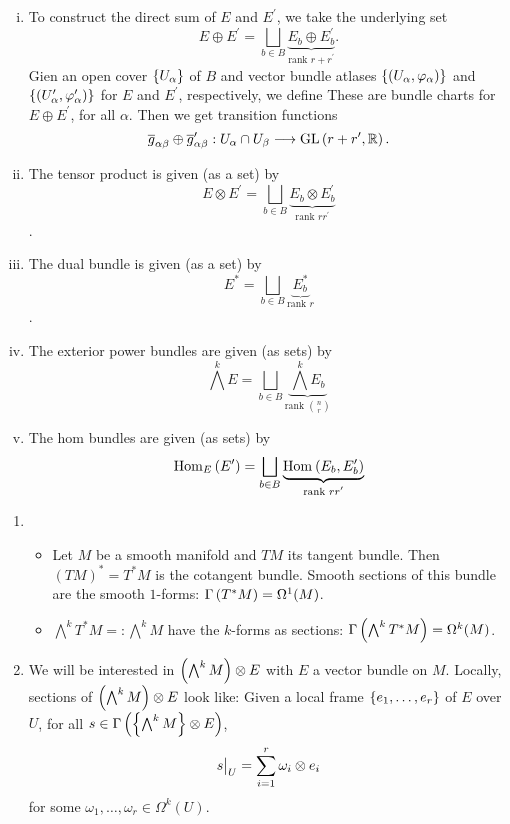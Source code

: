 \documentclass[main.tex]{subfiles}
\begin{document}
\begin{enumerate}[(i)]
    \item To construct the direct sum of $E$ and $E^\prime$, we take the underlying set \[E \oplus E^\prime = \bigsqcup_{b \in B} \underbrace{E_b \oplus  E^\prime_b}_{\text{rank }r+r^\prime }. \] Gien an open cover $\left\{U_\alpha\right\}$ of $B$ and vector bundle atlases $\left\{ \left(  U_\alpha, \varphi_\alpha  \right) \right\}$ and $\left\{ \left( U_\alpha^\prime, \varphi_\alpha^\prime \right) \right\}$ for $E$ and $E^\prime$, respectively, we define
    These are bundle charts for $E \oplus E^\prime$, for all $\alpha$. Then we get transition functions 
    \[
    \overline{g}_{\alpha\beta} \oplus \overline{g}_{\alpha\beta}^\prime : U_\alpha \cap U_\beta \longrightarrow \text{GL}\left( r + r^\prime, \mathbb{R} \right).
    \]
    \item  The tensor product is given (as a set) by \[E \otimes E^\prime = \bigsqcup_{b \in B} \underbrace{E_b \otimes  E^\prime_b}_{\text{rank }rr^\prime }\].
     \item  The dual bundle is given (as a set) by \[E^*= \bigsqcup_{b \in B} \underbrace{E_b^*}_{\text{rank } r}\].
     \item The exterior power bundles are given (as sets) by 
     \[
     \bigwedge^k E = \bigsqcup_{b \in B} \underbrace{\bigwedge^k E_b}_{\text{rank $n \choose r$}}
     \]
     \item The hom bundles are given (as sets) by 
     \[
     \text{Hom}_{E}\left( E^\prime \right) = \bigsqcup_{b \in B} \underbrace{\text{Hom}_{}\left( E_b, E^\prime_b \right)}_{\text{rank $r r^\prime$}}
     \]
\end{enumerate}

\begin{exmp}
    \begin{enumerate}
        \item 
            \begin{itemize}
                \item Let $M$ be a smooth manifold and $TM$ its tangent bundle. Then $(TM)^* = T^*M$ is the cotangent bundle. Smooth sections of this bundle are the smooth $1$-forms: $\Gamma\left( T^*M \right) = \Omega^1(M)$.
                \item $\bigwedge^k T^*M =: \bigwedge^k M$ have the $k$-forms as sections: $\Gamma\left( \bigwedge^k T^*M \right) = \Omega^k(M)$.
            \end{itemize}
        \item We will be interested in $\left(  \bigwedge^k M \right) \otimes E$ with $E$ a vector bundle on $M$. Locally, sections of $\left( \bigwedge^k M \right) \otimes E$ look like: Given a local frame $\left\{e_1, \dots, e_r\right\}$ of $E$ over $U$, for all $s \in \Gamma\left(  \left\{\bigwedge^k M\right\} \otimes E  \right)$, 
        \[
        s\big|_{U} = \sum_{i=1}^r \omega_i \otimes e_i
        \] for some $\omega_1, \dots, \omega_r \in \Omega^k(U)$.
    \end{enumerate}
\end{exmp}
\end{document}
